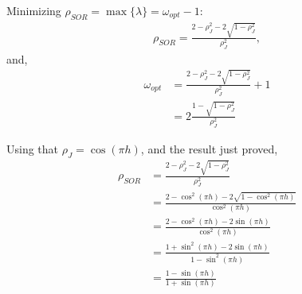 \begin{questions}
\begin{solution}
Minimizing $\rho_{SOR}=\max\{\lambda\}=\omega_{opt}-1$:
\begin{align*}
\rho_{SOR}=\frac{2-\rho_J^2-2\sqrt{1-\rho_J^2}}{\rho_J^2},
\end{align*}
and,
\begin{align*}
\omega_{opt}&=\frac{2-\rho_J^2-2\sqrt{1-\rho_J^2}}{\rho_J^2}+1\\
&=2\frac{1-\sqrt{1-\rho_J^2}}{\rho_J^2}
\end{align*}
\end{solution}
\begin{solution}
Using that $\rho_J=\cos(\pi h)$, and the result just proved,
\begin{align*}
\rho_{SOR}&=\frac{2-\rho_J^2-2\sqrt{1-\rho_J^2}}{\rho_J^2}\\
&=\frac{2-\cos^2(\pi h)-2\sqrt{1-\cos^2(\pi h)}}{\cos^2(\pi h)}\\
&=\frac{2-\cos^2(\pi h)-2\sin(\pi h)}{\cos^2(\pi h)}\\
&=\frac{1+\sin^2(\pi h)-2\sin(\pi h)}{1-\sin^2(\pi h)}\\
&=\frac{1-\sin(\pi h)}{1+\sin(\pi h)}\\
\end{align*}
\end{solution}
\end{questions}
